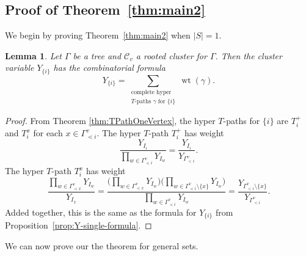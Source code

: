 \documentclass[10pt,a4paper]{amsart}
\numberwithin{equation}{section}
\newtheorem{Lemma}[Theorem]{Lemma}
\DeclareMathOperator{\wt}{wt}
\newcommand{\calC}{\mathcal{C}}
\begin{document}
\subsection[Proof of the hyper T-path expansion theorem]{Proof of Theorem~\ref{thm:main2}}\label{sec:pf-thm-2}
We begin by proving Theorem~\ref{thm:main2} when $|S|=1$.
\begin{Lemma}
Let $\Gamma$ be a tree and $\calC_v$ a rooted cluster for $\Gamma$. Then the cluster variable $Y_{\{i\}}$ has the combinatorial formula \[ Y_{\{i\}}=\sum_{\substack{\text{complete hyper}\\T\text{-paths }\gamma\text{ for }\{i\}}}\wt(\gamma).\]
\end{Lemma}
\begin{proof}
From Theorem \ref{thm:TPathOneVertex}, the hyper $T$-paths for $\{i\}$ are $T_i^{+}$ and $T_i^x$ for each $x\in\Gamma_{\lessdot i}^v$. The hyper $T$-path $T_i^{+}$ has weight \[ \frac{Y_{I_{i}}}{\prod_{w\in\Gamma_{\lessdot i}^v} Y_{I_{w}}}=\frac{Y_{I_{i}}}{Y_{\Gamma_{< i}^v}}.\]
The hyper $T$-path $T_i^x$ has weight
\[ \frac{\prod_{w \in \Gamma_{\lessdot x}^v} Y_{I_w}}{Y_{I_{x}}} = \frac{\Big(\prod_{w \in \Gamma_{\lessdot x}^v} Y_{I_w}\Big)\Big(\prod_{w\in\Gamma_{\lessdot i}^v\setminus\{x\}} Y_{I_{w}}\Big)}{\prod_{w\in\Gamma_{\lessdot i}^v} Y_{I_{w}}}= \frac{Y_{\Gamma_{< i}^v\setminus\{x\}} }{Y_{\Gamma_{< i}^v}}.\]
Added together, this is the same as the formula for $Y_{\{i\}}$ from Proposition~\ref{prop:Y-single-formula}.
\end{proof}
We can now prove our the theorem for general sets.
\end{document}

